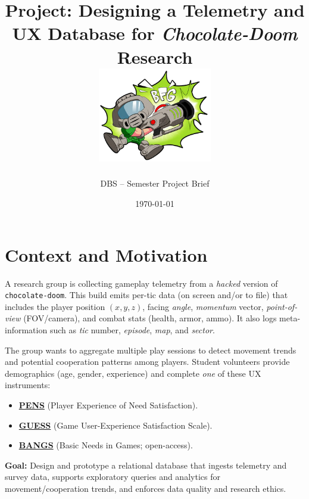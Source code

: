 \documentclass[11pt]{article}
\title{\vspace{-1em}Project: Designing a Telemetry and UX Database for \textit{Chocolate-Doom} Research \\
\includegraphics[width=5cm]{figures/doomguy2.png}
}
\author{DBS -- Semester Project Brief}
\date{\today}
\begin{document}
\maketitle
\tableofcontents

\section{Context and Motivation}
A research group is collecting gameplay telemetry from a \emph{hacked} version of \texttt{chocolate-doom}. This build emits per-tic data (on screen and/or to file) that includes the player position $(x,y,z)$, facing \emph{angle}, \emph{momentum} vector, \emph{point-of-view} (FOV/camera), and combat stats (health, armor, ammo). It also logs meta-information such as \emph{tic} number, \emph{episode}, \emph{map}, and \emph{sector}.

The group wants to aggregate multiple play sessions to detect movement trends and potential cooperation patterns among players. Student volunteers provide demographics (age, gender, experience) and complete \emph{one} of these UX instruments:
\begin{itemize}[leftmargin=*]
  \item \href{https://selfdeterminationtheory.org/player-experience-of-needs-satisfaction-pens}{\textbf{PENS}} (Player Experience of Need Satisfaction).
  \item \href{https://uxpajournal.org/wp-content/uploads/sites/7/pdf/JUS_Keebler_GUESS-18%20Scoring%20Guidelines.pdf}{\textbf{GUESS}} (Game User-Experience Satisfaction Scale).
  \item \href{https://www.sciencedirect.com/science/article/pii/S1071581924000739}{\textbf{BANGS}} (Basic Needs in Games; open-access).
\end{itemize}

\textbf{Goal:} Design and prototype a relational database that ingests telemetry and survey data, supports exploratory queries and analytics for movement/cooperation trends, and enforces data quality and research ethics.
\end{document}
